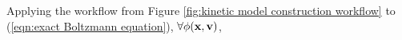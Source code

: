     Applying the workflow from Figure \ref{fig:kinetic model construction workflow} to (\ref{eqn:exact Boltzmann equation}), $\forall \phi(\mathbf{x}, \mathbf{v})$,
    